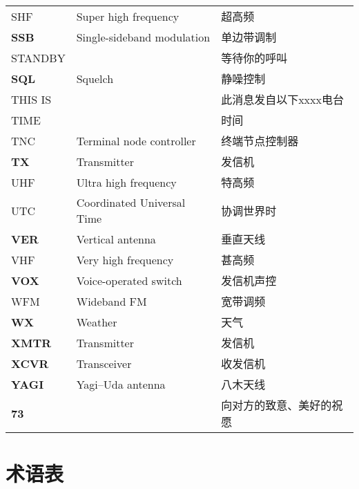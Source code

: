 \begin{longtable}[l]{lll}
	SHF            & Super high frequency                 & 超高频                 \\
	\textbf{SSB}   & Single-sideband modulation           & 单边带调制               \\
	STANDBY        &                                      & 等待你的呼叫              \\
	\textbf{SQL}   & Squelch                              & 静噪控制                \\
	THIS IS        &                                      & 此消息发自以下xxxx电台       \\
	TIME           &                                      & 时间                  \\
	TNC            & Terminal node controller             & 终端节点控制器             \\
	\textbf{TX}    & Transmitter                          & 发信机                 \\
	UHF            & Ultra high frequency                 & 特高频                 \\
	UTC            & Coordinated Universal Time           & 协调世界时               \\
	\textbf{VER}   & Vertical antenna                     & 垂直天线                \\
	VHF            & Very high frequency                  & 甚高频                 \\
	\textbf{VOX}   & Voice-operated switch                & 发信机声控               \\
	WFM            & Wideband FM                          & 宽带调频                \\
	\textbf{WX}    & Weather                              & 天气                  \\
	\textbf{XMTR}  & Transmitter                          & 发信机                 \\
	\textbf{XCVR}  & Transceiver                          & 收发信机                \\
	\textbf{YAGI}  & Yagi–Uda antenna                     & 八木天线                \\
	\textbf{73}    &                                      & 向对方的致意、美好的祝愿        \\
\end{longtable}

\newpage

\section{术语表}

